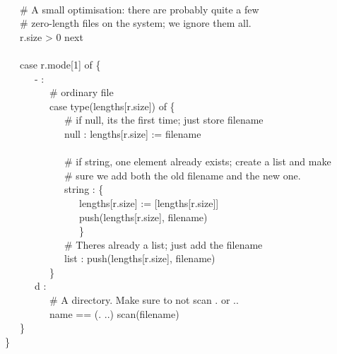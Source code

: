 {\ \\
\>   \ \ \ \# A small optimisation: there are probably quite a few \\
\>   \ \ \ \# zero-length files on the system; we ignore them all. \\
\>   \ \ \ r.size {\textgreater} 0 {\textbar} next \\
\ \\
\>   \ \ \ case r.mode[1] of \{ \\
\>   \ \ \ \ \ \ {\textquotedbl}-{\textquotedbl} : \\
\>   \ \ \ \ \ \ \ \ \ \# ordinary file \\
\>   \ \ \ \ \ \ \ \ \ case type(lengths[r.size]) of \{ \\
\>   \ \ \ \ \ \ \ \ \ \ \ \ \# if null, it{\textquotesingle}s the
first time; just store filename \\
\>   \ \ \ \ \ \ \ \ \ \ \ \ {\textquotedbl}null{\textquotedbl} :
lengths[r.size] := filename \\
\ \\
\>   \ \ \ \ \ \ \ \ \ \ \ \ \# if string, one element already exists;
create a list and make\\
\>   \ \ \ \ \ \ \ \ \ \ \ \ \# sure we add both the old
filename and the new one. \\
\>   \ \ \ \ \ \ \ \ \ \ \ \ {\textquotedbl}string{\textquotedbl} : \{ \\
\>   \ \ \ \ \ \ \ \ \ \ \ \ \ \ \ lengths[r.size] :=
[lengths[r.size]] \\
\>   \ \ \ \ \ \ \ \ \ \ \ \ \ \ \ push(lengths[r.size], filename) \\
\>   \ \ \ \ \ \ \ \ \ \ \ \ \ \ \ \} \\
\>   \ \ \ \ \ \ \ \ \ \ \ \ \# There{\textquotesingle}s already a
list; just add the filename \\
\>   \ \ \ \ \ \ \ \ \ \ \ \ {\textquotedbl}list{\textquotedbl} :
push(lengths[r.size], filename) \\
\>   \ \ \ \ \ \ \ \ \ \} \\
\>   \ \ \ \ \ \ {\textquotedbl}d{\textquotedbl} : \\
\>   \ \ \ \ \ \ \ \ \ \# A directory. Make sure to not scan . or .. \\
\>   \ \ \ \ \ \ \ \ \ name == ({\textquotedbl}.{\textquotedbl}
{\textbar} {\textquotedbl}..{\textquotedbl}) {\textbar} scan(filename) \\
\>   \ \ \ \} \\
\>   \} \\
}
